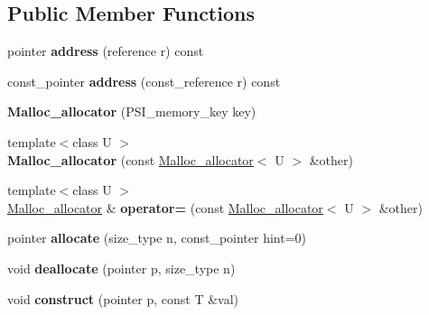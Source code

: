 \subsection*{Public Member Functions}
\begin{DoxyCompactItemize}
\item 
\mbox{\label{classMalloc__allocator_a58d7798466db0ee1f475ffe947bb3d69}} 
pointer {\bfseries address} (reference r) const
\item 
\mbox{\label{classMalloc__allocator_a4a610b0d55814283ac3606457702e1fc}} 
const\+\_\+pointer {\bfseries address} (const\+\_\+reference r) const
\item 
\mbox{\label{classMalloc__allocator_afd7f3dc0141f6cb39bd6aa54e7c42177}} 
{\bfseries Malloc\+\_\+allocator} (P\+S\+I\+\_\+memory\+\_\+key key)
\item 
\mbox{\label{classMalloc__allocator_a94fa3818210581322b31968af7e89eee}} 
{\footnotesize template$<$class U $>$ }\\{\bfseries Malloc\+\_\+allocator} (const \mbox{\hyperlink{classMalloc__allocator}{Malloc\+\_\+allocator}}$<$ U $>$ \&other)
\item 
\mbox{\label{classMalloc__allocator_ad48052fb97f8c5b01f986bb4848783b4}} 
{\footnotesize template$<$class U $>$ }\\\mbox{\hyperlink{classMalloc__allocator}{Malloc\+\_\+allocator}} \& {\bfseries operator=} (const \mbox{\hyperlink{classMalloc__allocator}{Malloc\+\_\+allocator}}$<$ U $>$ \&other)
\item 
\mbox{\label{classMalloc__allocator_a3f60ef92f8e45d93c2523cccc9a4b794}} 
pointer {\bfseries allocate} (size\+\_\+type n, const\+\_\+pointer hint=0)
\item 
\mbox{\label{classMalloc__allocator_a28330df90a3d61e8c9d919568965eefe}} 
void {\bfseries deallocate} (pointer p, size\+\_\+type n)
\item 
\mbox{\label{classMalloc__allocator_a08566f1f97856f6c469e01254701bce6}} 
void {\bfseries construct} (pointer p, const T \&val)

\end{DoxyCompactItemize}
